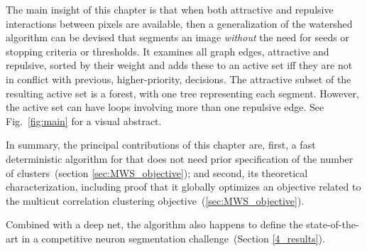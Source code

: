 The main insight of this chapter is that when both attractive and repulsive interactions between pixels are available, then a generalization of the watershed algorithm can be devised that segments an image {\em without} the need for seeds or stopping criteria or thresholds. It examines all graph edges, attractive and repulsive, sorted by their weight and adds these to an active set iff they are not in conflict with previous, higher-priority, decisions. The attractive subset of the resulting active set  is a forest, with one tree representing each segment. However, the active set can have loops involving more than one repulsive edge.
 See Fig.~\ref{fig:main} for a visual abstract. 

In summary, the principal contributions of this chapter are, first, 
a fast deterministic algorithm for  that does not need prior specification of the number of clusters~(section \ref{sec:MWS_objective}); and second, its theoretical characterization, including proof that it globally optimizes an objective related to the multicut correlation clustering objective~(\ref{sec:MWS_objective}).

Combined with a deep net, the algorithm also happens to define the state-of-the-art in a competitive neuron segmentation challenge~(Section \ref{4_results}).




